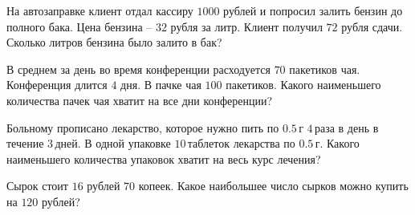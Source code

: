 \begin{homework}[number=1]
\begin{listofex}
	\item На автозаправке клиент отдал кассиру \( 1000 \) рублей и попросил залить бензин до полного бака. Цена бензина -- \( 32 \) рубля за литр. Клиент получил \( 72 \) рубля сдачи. Сколько литров бензина было залито в бак?
	\item В среднем за день во время конференции расходуется \( 70 \) пакетиков чая. Конференция длится \(  4 \) дня. В пачке чая \( 100 \) пакетиков. Какого наименьшего количества пачек чая хватит на все дни конференции?
	\item Больному прописано лекарство, которое нужно пить по \( 0.5 \) г \( 4 \) раза в день в течение \( 3 \) дней. В одной упаковке \( 10 \) таблеток лекарства по \( 0.5 \) г. Какого наименьшего количества упаковок хватит на весь курс лечения?
	\item Сырок стоит \( 16 \) рублей \( 70 \) копеек. Какое наибольшее число сырков можно купить на \( 120 \) рублей?
	\end{listofex}
\end{homework}
%
%
%
%		
%
%
%	
%
%
%	
%
%
%	
%
%
%
%	
%
%
%	
%
%
%	
